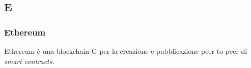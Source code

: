 \subsection*{\textbf{\hfill \Huge{E} \hfill}} 
\subsubsection*{Ethereum}
Ethereum è una blockchain G per la creazione e pubblicazione peer-to-peer di  \textit{smart contracts}\glos .
